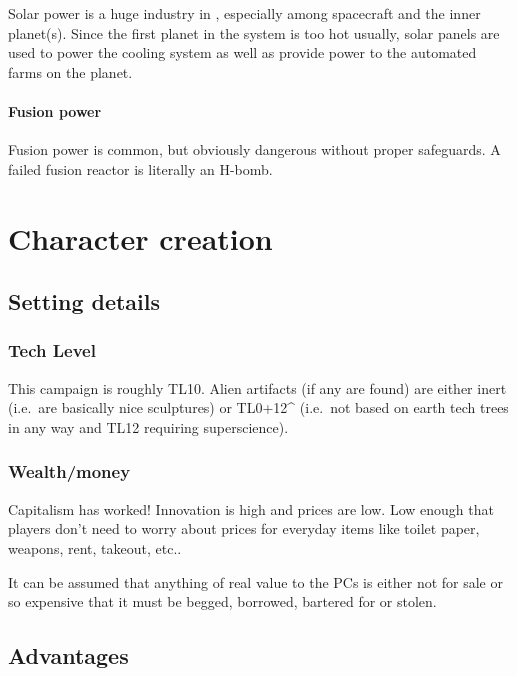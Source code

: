 Solar power is a huge industry in , especially among spacecraft and
the inner planet(s). Since the first planet in the system is too hot usually,
solar panels are used to power the cooling system as well as provide power to
the automated farms on the planet.

\subsubsection{Fusion power}
\label{sec:fusion-power}

Fusion power is common, but obviously dangerous without proper safeguards. A
failed fusion reactor is literally an H-bomb.


\chapter{Character creation}
\label{cha:character-creation}

\section{Setting details}
\label{sec:setting-details}

\subsection{Tech Level}
\label{sec:tech-level}

This campaign is roughly TL10. Alien artifacts (if any are found) are either
inert (i.e.~are basically nice sculptures) or TL0+12\^{} (i.e.~not based on
earth tech trees in any way and TL12 requiring superscience).

\subsection{Wealth/money}
Capitalism has worked! Innovation is high and prices are low. Low enough that 
players don't need to worry about prices for everyday items like toilet paper,
weapons, rent, takeout, etc..

It can be assumed that anything of real value to the PCs is either
not for sale or so expensive that it must be begged, borrowed, bartered for or
stolen.


\section{Advantages}
\label{sec:advantages}

